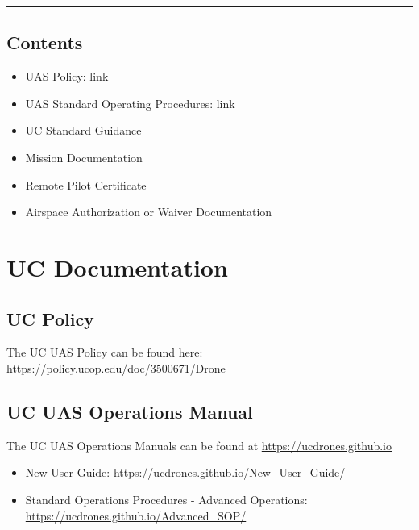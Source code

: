 \documentclass[
]{book}
\providecommand{\tightlist}{%
  \setlength{\itemsep}{0pt}\setlength{\parskip}{0pt}}
\begin{document}
\begin{center}\rule{0.5\linewidth}{0.5pt}\end{center}

\hypertarget{contents}{%
\section*{Contents}\label{contents}}

\begin{itemize}
\tightlist
\item
  UAS Policy: link
\item
  UAS Standard Operating Procedures: link
\item
  UC Standard Guidance
\item
  Mission Documentation
\item
  Remote Pilot Certificate
\item
  Airspace Authorization or Waiver Documentation
\end{itemize}

\hypertarget{ch-docs}{%
\chapter{UC Documentation}\label{ch-docs}}

\hypertarget{uc-policy}{%
\section{UC Policy}\label{uc-policy}}

The UC UAS Policy can be found here: \url{https://policy.ucop.edu/doc/3500671/Drone}

\hypertarget{uc-uas-operations-manual}{%
\section{UC UAS Operations Manual}\label{uc-uas-operations-manual}}

The UC UAS Operations Manuals can be found at \url{https://ucdrones.github.io}

\begin{itemize}
\tightlist
\item
  New User Guide: \url{https://ucdrones.github.io/New_User_Guide/}
\item
  Standard Operations Procedures - Advanced Operations: \url{https://ucdrones.github.io/Advanced_SOP/}
\end{itemize}
\end{document}
